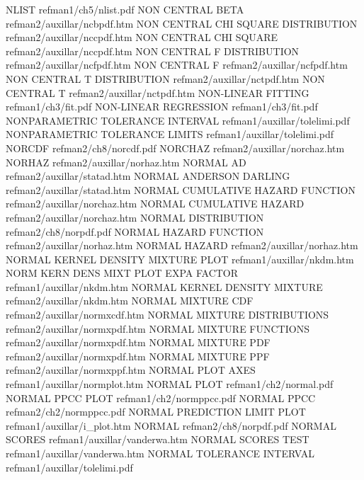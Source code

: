 NLIST                                   refman1/ch5/nlist.pdf
NON CENTRAL BETA                        refman2/auxillar/ncbpdf.htm
NON CENTRAL CHI SQUARE DISTRIBUTION     refman2/auxillar/nccpdf.htm
NON CENTRAL CHI SQUARE                  refman2/auxillar/nccpdf.htm
NON CENTRAL F DISTRIBUTION              refman2/auxillar/ncfpdf.htm
NON CENTRAL F                           refman2/auxillar/ncfpdf.htm
NON CENTRAL T DISTRIBUTION              refman2/auxillar/nctpdf.htm
NON CENTRAL T                           refman2/auxillar/nctpdf.htm
NON-LINEAR FITTING                      refman1/ch3/fit.pdf
NON-LINEAR REGRESSION                   refman1/ch3/fit.pdf
NONPARAMETRIC TOLERANCE INTERVAL        refman1/auxillar/tolelimi.pdf
NONPARAMETRIC TOLERANCE LIMITS          refman1/auxillar/tolelimi.pdf
NORCDF                                  refman2/ch8/norcdf.pdf
NORCHAZ                                 refman2/auxillar/norchaz.htm
NORHAZ                                  refman2/auxillar/norhaz.htm
NORMAL AD                               refman2/auxillar/statad.htm
NORMAL ANDERSON DARLING                 refman2/auxillar/statad.htm
NORMAL CUMULATIVE HAZARD FUNCTION       refman2/auxillar/norchaz.htm
NORMAL CUMULATIVE HAZARD                refman2/auxillar/norchaz.htm
NORMAL DISTRIBUTION                     refman2/ch8/norpdf.pdf
NORMAL HAZARD FUNCTION                  refman2/auxillar/norhaz.htm
NORMAL HAZARD                           refman2/auxillar/norhaz.htm
NORMAL KERNEL DENSITY MIXTURE PLOT      refman1/auxillar/nkdm.htm
NORM KERN DENS MIXT PLOT EXPA FACTOR    refman1/auxillar/nkdm.htm
NORMAL KERNEL DENSITY MIXTURE           refman2/auxillar/nkdm.htm
NORMAL MIXTURE CDF                      refman2/auxillar/normxcdf.htm
NORMAL MIXTURE DISTRIBUTIONS            refman2/auxillar/normxpdf.htm
NORMAL MIXTURE FUNCTIONS                refman2/auxillar/normxpdf.htm
NORMAL MIXTURE PDF                      refman2/auxillar/normxpdf.htm
NORMAL MIXTURE PPF                      refman2/auxillar/normxppf.htm
NORMAL PLOT AXES                        refman1/auxillar/normplot.htm
NORMAL PLOT                             refman1/ch2/normal.pdf
NORMAL PPCC PLOT                        refman1/ch2/normppcc.pdf
NORMAL PPCC                             refman2/ch2/normppcc.pdf
NORMAL PREDICTION LIMIT PLOT            refman1/auxillar/i_plot.htm
NORMAL                                  refman2/ch8/norpdf.pdf
NORMAL SCORES                           refman1/auxillar/vanderwa.htm
NORMAL SCORES TEST                      refman1/auxillar/vanderwa.htm
NORMAL TOLERANCE INTERVAL               refman1/auxillar/tolelimi.pdf
